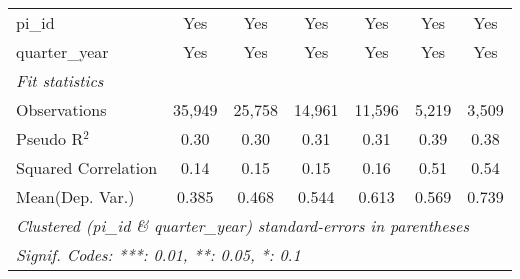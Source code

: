 \begin{tabular}{lcccccc}
   pi\_id                                                     & Yes           & Yes           & Yes           & Yes           & Yes           & Yes\\  
   quarter\_year                                              & Yes           & Yes           & Yes           & Yes           & Yes           & Yes\\  
   \midrule
   \emph{Fit statistics}\\
   Observations                                               & 35,949        & 25,758        & 14,961        & 11,596        & 5,219         & 3,509\\  
   Pseudo R$^2$                                               & 0.30          & 0.30          & 0.31          & 0.31          & 0.39          & 0.38\\  
   Squared Correlation                                        & 0.14          & 0.15          & 0.15          & 0.16          & 0.51          & 0.54\\  
Mean(Dep. Var.) & 0.385 & 0.468 & 0.544 & 0.613 & 0.569 & 0.739 \\
   \midrule \midrule
   \multicolumn{7}{l}{\emph{Clustered (pi\_id \& quarter\_year) standard-errors in parentheses}}\\
   \multicolumn{7}{l}{\emph{Signif. Codes: ***: 0.01, **: 0.05, *: 0.1}}\\
\end{tabular}
\par\endgroup
